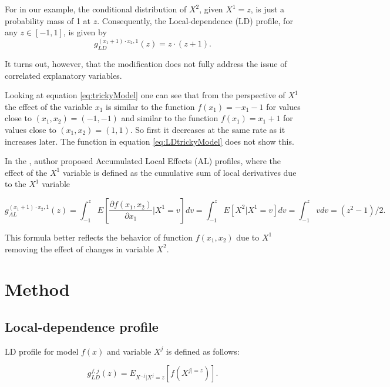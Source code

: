 \documentclass[]{krantz}
\begin{document}
For in our example, the conditional distribution of \(X^2\), given \(X^1=z\), is just a probability mass of 1 at \(z\). Consequently, the Local-dependence (LD) profile, for any \(z \in [-1,1]\), is given by
\begin{equation}
g_{LD}^{(x_1 + 1)\cdot x_2, 1}(z) =  z \cdot (z+1).
\label{eq:LDtrickyModel}
\end{equation}

It turns out, however, that the modification does not fully address the issue of correlated explanatory variables.

Looking at equation \eqref{eq:trickyModel} one can see that from the perspective of \(X^1\) the effect of the variable \(x_1\) is similar to the function \(f(x_1) = -x_1 -1\) for values close to \((x_1, x_2) = (-1,-1)\) and similar to the function \(f(x_1) = x_1 +1\) for values close to \((x_1, x_2) = (1,1)\). So first it decreases at the same rate as it increases later. The function in equation \eqref{eq:LDtrickyModel} does not show this.

In the \citep{ALEPlotRPackage}, author proposed Accumulated Local Effects (AL) profiles, where the effect of the \(X^1\) variable is defined as the cumulative sum of local derivatives due to the \(X^1\) variable

\begin{equation}
g_{AL}^{(x_1 + 1)\cdot x_2, 1}(z) = 
\int_{-1}^z E \left[\frac{\partial f(x_1, x_2)}{\partial x_1} | X^1 = v \right] dv = 
\int_{-1}^z E \left[X^2 | X^1 = v \right] dv = 
\int_{-1}^z v dv =
(z^2 - 1)/2.
\label{eq:ALtrickyModel}
\end{equation}

This formula better reflects the behavior of function \(f(x_1,x_2)\) due to \(X^1\) removing the effect of changes in variable \(X^2\).

\hypertarget{ALPMethod}{%
\section{Method}\label{ALPMethod}}

\hypertarget{local-dependence-profile}{%
\subsection{Local-dependence profile}\label{local-dependence-profile}}

LD profile for model \(f(x)\) and variable \(X^j\) is defined as follows:

\begin{equation}
g_{LD}^{f, j}(z) = E_{X^{-j}|X^j=z}\left[f\left(X^{j|=z}\right)\right].
\label{eq:LDPdef}
\end{equation}
\end{document}

